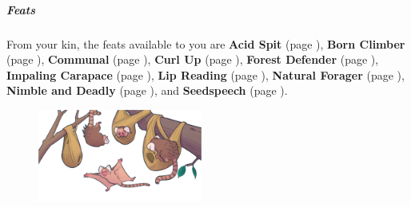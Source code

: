     \subparagraph{Feats} From your kin, the feats available to you are
    \textbf{Acid Spit} (page \pageref{feat::acidspit}),
    \textbf{Born Climber} (page \pageref{feat::bornclimber}),
    \textbf{Communal} (page \pageref{feat::communal}),
    \textbf{Curl Up} (page \pageref{feat::curlup}),
    \textbf{Forest Defender} (page \pageref{feat::forestdefender}),
    \textbf{Impaling Carapace} (page \pageref{feat::impalingcarapace}),
    \textbf{Lip Reading} (page \pageref{feat::lipreading}),
    \textbf{Natural Forager} (page \pageref{feat::naturalforager}),
    \textbf{Nimble and Deadly} (page \pageref{feat::nimbleanddeadly}), and
    \textbf{Seedspeech} (page \pageref{feat::seedspeech}).

\begin{figure}[!b]
    \centering
    \includegraphics[width=0.48\textwidth]{04kins/img/13marset_colony.png}
\end{figure}

\newpage
